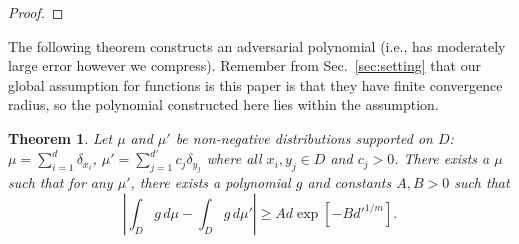 \documentclass{article}
\theoremstyle{plain}
\newtheorem{theorem}{Theorem}
\newtheorem{lemma}{Lemma}
\newenvironment{REV*}
  {\begingroup\color[HTML]{000000}}
  {\endgroup}
\begin{document}
\begin{REV*}
\begin{proof}
\end{proof}









The following theorem constructs an adversarial polynomial (i.e., has moderately large error however we compress). Remember from Sec.~\ref{sec:setting} that our global assumption for functions is this paper is that they have finite convergence radius, so the polynomial constructed here lies within the assumption. 


\begin{theorem} \label{thm:error_lower_bound}
    Let $\mu$ and $\mu'$ be non-negative distributions supported on $D$: $\mu = \sum_{i=1}^d \delta_{x_i}$, $\mu' = \sum_{j=1}^{d'} c_j \delta_{y_j}$ where all $x_i, y_j\in D$ and $c_j>0$. There exists a $\mu$ such that for any $\mu'$, there exists a polynomial $g$ and constants $A, B>0$ such that 
    \begin{equation}    \label{eq:error_lower_bound}
        \left| \int_D g\, d\mu - \int_D g\, d\mu' \right| \geq A d \exp [-B d'^{1/m}] .
    \end{equation}
\end{theorem}


\end{REV*}
\end{document}
